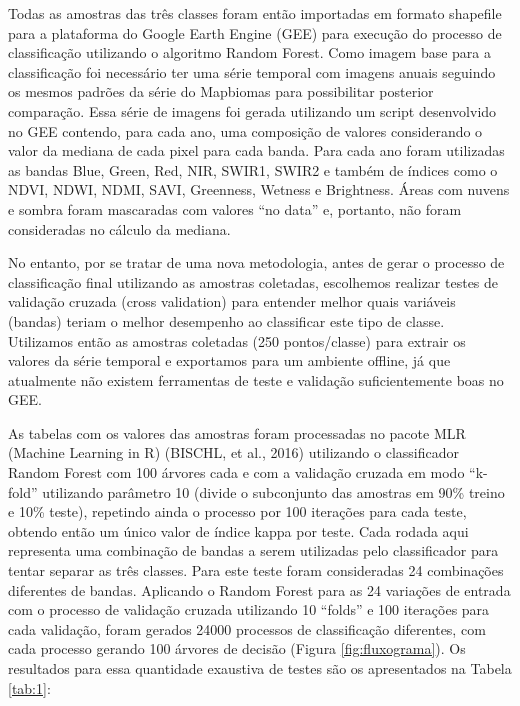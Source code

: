 \documentclass[12pt,a4paper]{article}
\begin{document}
Todas as amostras das três classes foram então importadas em formato shapefile para a plataforma do Google Earth Engine (GEE) para execução do processo de classificação utilizando o algoritmo Random Forest. Como imagem base para a classificação foi necessário ter uma série temporal com imagens anuais seguindo os mesmos padrões da série do Mapbiomas para possibilitar posterior comparação. Essa série de imagens foi gerada utilizando um script desenvolvido no GEE contendo, para cada ano, uma composição de valores considerando o valor da mediana de cada pixel para cada banda. Para cada ano foram utilizadas as bandas Blue, Green, Red, NIR, SWIR1, SWIR2 e também de índices como o NDVI, NDWI, NDMI, SAVI, Greenness, Wetness e Brightness. Áreas com nuvens e sombra foram mascaradas com valores “no data” e, portanto, não foram consideradas no cálculo da mediana.

No entanto, por se tratar de uma nova metodologia, antes de gerar o processo de classificação final utilizando as amostras coletadas, escolhemos realizar testes de validação cruzada (cross validation) para entender melhor quais variáveis (bandas) teriam o melhor desempenho ao classificar este tipo de classe. Utilizamos então as amostras coletadas (250 pontos/classe) para extrair os valores da série temporal e exportamos para um ambiente offline, já que atualmente não existem ferramentas de teste e validação suficientemente boas no GEE.

As tabelas com os valores das amostras foram processadas no pacote MLR (Machine Learning in R) (BISCHL, et al., 2016) utilizando o classificador Random Forest com 100 árvores cada e com a validação cruzada em modo “k-fold” utilizando parâmetro 10 (divide o subconjunto das amostras em 90\% treino e 10\% teste), repetindo ainda o processo por 100 iterações para cada teste, obtendo então um único valor de índice kappa por teste. Cada rodada aqui representa uma combinação de bandas a serem utilizadas pelo classificador para tentar separar as três classes. Para este teste foram consideradas 24 combinações diferentes de bandas. Aplicando o Random Forest para as 24 variações de entrada com o processo de validação cruzada utilizando 10 “folds” e 100 iterações para cada validação, foram gerados 24000 processos de classificação diferentes, com cada processo gerando 100 árvores de decisão (Figura \ref{fig:fluxograma}). Os resultados para essa quantidade exaustiva de testes são os apresentados na Tabela \ref{tab:1}:
\end{document}
